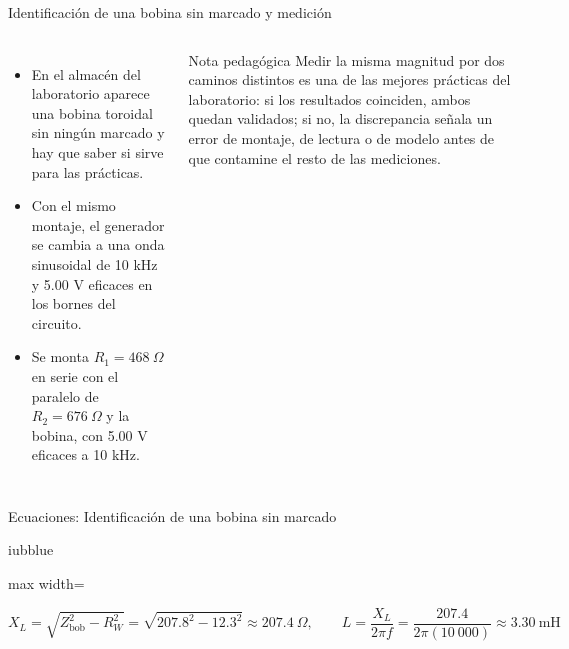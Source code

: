\documentclass[aspectratio=169,11pt,xcolor={table}]{beamer}
\begin{document}
\begin{frame}{{\normalsize Identificación de una bobina sin marcado y medición}}
\begin{columns}[c,onlytextwidth]
\small
\begin{itemize}\setlength{\itemsep}{4pt}
  \item En el almacén del laboratorio aparece una bobina toroidal sin ningún marcado y hay que saber si sirve para las prácticas.
  \item Con el mismo montaje, el generador se cambia a una onda sinusoidal de 10 kHz y 5.00 V eficaces en los bornes del circuito.
  \item Se monta $R_1 = 468\ \Omega$ en serie con el paralelo de $R_2 = 676\ \Omega$ y la bobina, con 5.00 V eficaces a 10 kHz.
\end{itemize}
\begin{cardO}{Nota pedagógica}
\footnotesize Medir la misma magnitud por dos caminos distintos es una de las mejores prácticas del laboratorio: si los resultados coinciden, ambos quedan validados; si no, la discrepancia señala un error de montaje, de lectura o de modelo antes de que contamine el resto de las mediciones.
\end{cardO}
\end{columns}
\end{frame}

\begin{frame}{{\normalsize Ecuaciones: Identificación de una bobina sin marcado}}
\begin{cajaplana}{iubblue}
\centering
\begin{adjustbox}{max width=\linewidth}
\begin{minipage}{2.00\linewidth}
{\large
\begin{equation*}
  X_L = \sqrt{Z_{\mathrm{bob}}^{2} - R_W^{2}} = \sqrt{207.8^{2} - 12.3^{2}} \approx 207.4\ \Omega, \qquad L = \frac{X_L}{2\pi f} = \frac{207.4}{2\pi(10\ 000)} \approx 3.30\ \text{mH}
\end{equation*}
}
\end{minipage}
\end{adjustbox}
\end{cajaplana}
\end{frame}
\end{document}
